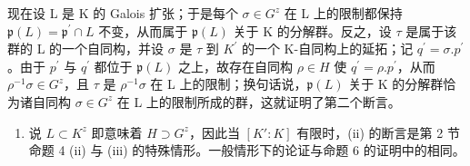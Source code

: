 现在设 L 是 K 的 Galois 扩张；于是每个 \(\sigma\in G^{z}\) 在 L 上的限制都保持 \(\mathfrak{p}(L)=\mathfrak{p}^{\prime}\cap L\) 不变，从而属于 \(\mathfrak{p}(L)\) 关于 K 的分解群。反之，设 \(\tau\) 是属于该群的 L 的一个自同构，并设 \(\sigma\) 是 \(\tau\) 到 \(K^{\prime}\) 的一个 K-自同构上的延拓；记 \(q^{\prime}=\sigma.p^{\prime}\)。由于 \(p^{\prime}\) 与 \(q^{\prime}\) 都位于 \(\mathfrak{p}(L)\) 之上，故存在自同构 \(\rho\in H\) 使 \(q^{\prime}=\rho.p^{\prime}\)，从而 \(\rho^{-1}\sigma\in G^{z}\)，且 \(\tau\) 是 \(\rho^{-1}\sigma\) 在 L 上的限制；换句话说，\(\mathfrak{p}(L)\) 关于 K 的分解群恰为诸自同构 \(\sigma\in G^{z}\) 在 L 上的限制所成的群，这就证明了第二个断言。

\begin{enumerate}
\def\labelenumi{(\roman{enumi})}
\setcounter{enumi}{1}
\tightlist
\item
  说 \(L \subset K^{z}\) 即意味着 \(H \supset G^{z}\)，因此当 \([K':K]\) 有限时，(ii) 的断言是第 2 节命题 4 (ii) 与 (iii) 的特殊情形。一般情形下的论证与命题 6 的证明中的相同。
\end{enumerate}


